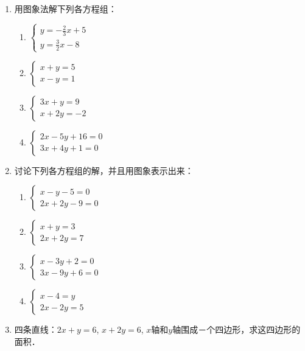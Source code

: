 \begin{enumerate}
\item     用图象法解下列各方程组：
  \begin{multicols}{2}
\begin{enumerate}
    \item $\begin{cases}
        y=-\frac{2}{3}x+5\\
        y=\frac{3}{2}x-8
    \end{cases}$
    \item $\begin{cases}
        x+y=5\\x-y=1
    \end{cases}$
    \item $\begin{cases}
        3x+y=9\\x+2y=-2
    \end{cases}$
    \item $\begin{cases}
        2x-5y+16=0\\3x+4y+1=0
    \end{cases}$
\end{enumerate}
\end{multicols}
    \item 讨论下列各方程组的解，并且用图象表示出来：
    \begin{multicols}{2}
        \begin{enumerate}
\item $\begin{cases}
    x-y-5=0\\2x+2y-9=0
\end{cases}$    
\item $\begin{cases}
     x+y=3\\2x+2y=7
\end{cases}$ 
\item $\begin{cases}
    x-3y+2=0\\3x-9y+6=0
\end{cases}$ 
\item $\begin{cases}
    x-4=y\\2x-2y=5
\end{cases}$ 
        \end{enumerate}
\end{multicols}
   
\item 四条直线：$2x+y=6$, $x+2y=6$, $x$轴和$y$轴围成－个四边形，求这四边形的面积．

\end{enumerate}

